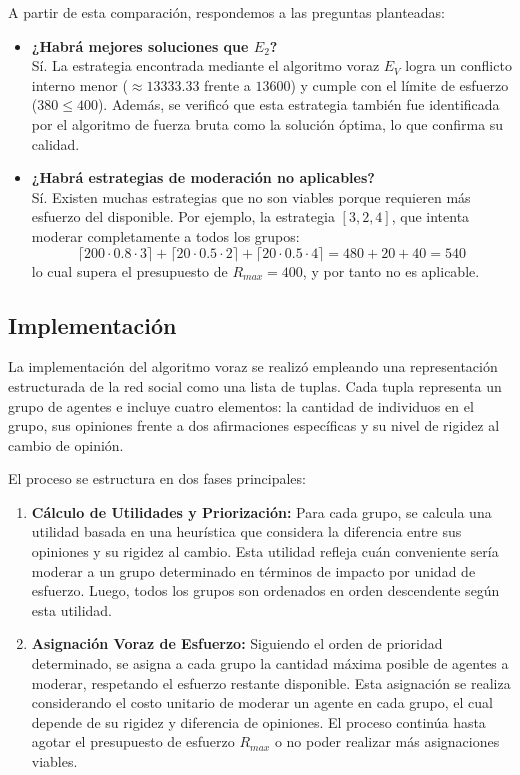 \documentclass[11pt,letter]{article}
\begin{document}
A partir de esta comparación, respondemos a las preguntas planteadas:

\begin{itemize}
    \item \textbf{¿Habrá mejores soluciones que $E_2$?} \\
    Sí. La estrategia encontrada mediante el algoritmo voraz $E_V$ logra un conflicto interno menor ($\approx 13333.33$ frente a $13600$) y cumple con el límite de esfuerzo ($380 \leq 400$). Además, se verificó que esta estrategia también fue identificada por el algoritmo de fuerza bruta como la solución óptima, lo que confirma su calidad.

    \item \textbf{¿Habrá estrategias de moderación no aplicables?} \\
    Sí. Existen muchas estrategias que no son viables porque requieren más esfuerzo del disponible. Por ejemplo, la estrategia $[3, 2, 4]$, que intenta moderar completamente a todos los grupos:
    \[
    \lceil 200 \cdot 0.8 \cdot 3 \rceil + \lceil 20 \cdot 0.5 \cdot 2 \rceil + \lceil 20 \cdot 0.5 \cdot 4 \rceil = 480 + 20 + 40 = 540
    \]
    lo cual supera el presupuesto de $R_{max} = 400$, y por tanto no es aplicable.
\end{itemize}


    \subsection{Implementación}

    La implementación del algoritmo voraz se realizó empleando una representación estructurada de la red social como una lista de tuplas. Cada tupla representa un grupo de agentes e incluye cuatro elementos: la cantidad de individuos en el grupo, sus opiniones frente a dos afirmaciones específicas y su nivel de rigidez al cambio de opinión.

    El proceso se estructura en dos fases principales:

    \begin{enumerate}
        \item \textbf{Cálculo de Utilidades y Priorización:} Para cada grupo, se calcula una utilidad basada en una heurística que considera la diferencia entre sus opiniones y su rigidez al cambio. Esta utilidad refleja cuán conveniente sería moderar a un grupo determinado en términos de impacto por unidad de esfuerzo. Luego, todos los grupos son ordenados en orden descendente según esta utilidad.

        \item \textbf{Asignación Voraz de Esfuerzo:} Siguiendo el orden de prioridad determinado, se asigna a cada grupo la cantidad máxima posible de agentes a moderar, respetando el esfuerzo restante disponible. Esta asignación se realiza considerando el costo unitario de moderar un agente en cada grupo, el cual depende de su rigidez y diferencia de opiniones. El proceso continúa hasta agotar el presupuesto de esfuerzo $R_{max}$ o no poder realizar más asignaciones viables.
    \end{enumerate}
\end{document}
